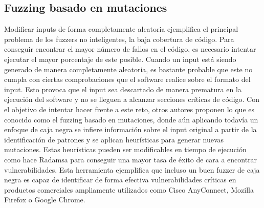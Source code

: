 \subsection{Fuzzing basado en mutaciones}
Modificar inputs de forma completamente aleatoria
ejemplifica el principal problema de los fuzzers no inteligentes, la baja cobertura de código. Para conseguir encontrar 
el mayor número de fallos en el código, es necesario intentar ejecutar el mayor porcentaje de este posible. Cuando 
un input está siendo generado de manera completamente aleatoria, es bastante probable que este no cumpla con
ciertas comprobaciones que el software realice sobre el formato del input. Esto provoca que el input sea descartado 
de manera prematura en la ejecución del software y no se lleguen a alcanzar secciones críticas de código.
Con el objetivo de intentar hacer frente a este reto, otros autores proponen lo que es 
conocido como el fuzzing basado en mutaciones, donde aún aplicando todavía un enfoque de caja negra se infiere
información sobre el input original a partir de la identificación de patrones y se aplican heurísticas para generar
nuevas mutaciones. Estas heurísticas pueden ser modificables en tiempo de ejecución como hace Radamsa\cite{radamsa}
para conseguir una mayor tasa de éxito de cara a encontrar vulnerabilidades. Esta herramienta ejemplifica que incluso 
un buen fuzzer de caja negra es capaz de identificar de forma efectiva vulnerabilidades críticas en productos comerciales 
ampliamente utilizados como Cisco AnyConnect, Mozilla Firefox o Google Chrome.

